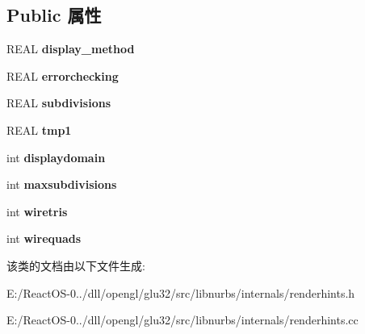 \subsection*{Public 属性}
\begin{DoxyCompactItemize}
\item 
\mbox{\label{class_renderhints_a69d80fab572ed2bd6526da890765acd6}} 
R\+E\+AL {\bfseries display\+\_\+method}
\item 
\mbox{\label{class_renderhints_ad372f315732ae968e100f07106c31dd0}} 
R\+E\+AL {\bfseries errorchecking}
\item 
\mbox{\label{class_renderhints_a1823beaaa3b32feb51c983c950b323b8}} 
R\+E\+AL {\bfseries subdivisions}
\item 
\mbox{\label{class_renderhints_ae956375c8d23c0aec97a204031196709}} 
R\+E\+AL {\bfseries tmp1}
\item 
\mbox{\label{class_renderhints_ac07df7c1d8310ab785240b8e0f6c964c}} 
int {\bfseries displaydomain}
\item 
\mbox{\label{class_renderhints_a543a72117bcf7a887672362cea31b8f2}} 
int {\bfseries maxsubdivisions}
\item 
\mbox{\label{class_renderhints_a4f87a325352f7a109f697d3d47d7f255}} 
int {\bfseries wiretris}
\item 
\mbox{\label{class_renderhints_ae003be3c8c3352229d6aad2c9d0eadf5}} 
int {\bfseries wirequads}
\end{DoxyCompactItemize}


该类的文档由以下文件生成\+:\begin{DoxyCompactItemize}
\item 
E\+:/\+React\+O\+S-\/0../dll/opengl/glu32/src/libnurbs/internals/renderhints.\+h\item 
E\+:/\+React\+O\+S-\/0../dll/opengl/glu32/src/libnurbs/internals/renderhints.\+cc\end{DoxyCompactItemize}
